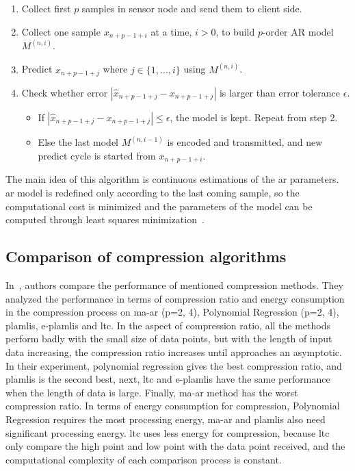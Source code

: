 \begin{enumerate}
    \item Collect first $p$ samples in sensor node and send them to client side.
    \item Collect one sample $x_{n+p-1+i}$ at a time, $i > 0$, to build
    $p$-order
    AR model $M^{(n, i)}$.
    \item Predict $x_{n+p-1+j}$ where $j \in \{1, ..., i\}$ using $M^{(n, i)}$.
    \item Check whether error $ |\hat{x}_{n+p-1+j} - x_{n+p-1+j}|$ is larger
    than error tolerance $\epsilon$.
        \begin{itemize}
            \item If $|\hat{x}_{n+p-1+j} - x_{n+p-1+j}| \leqslant \epsilon$, the
            model is kept. Repeat from step 2.
            \item Else the last model $M^{(n, i-1)}$ is encoded and transmitted,
            and new predict cycle is started from $x_{n+p-1+i}$.
        \end{itemize}
\end{enumerate}
The main idea of this algorithm is continuous estimations of the \acrshort{ar}
parameters. \acrshort{ar} model is redefined only according to the last coming
sample, so the computational cost is minimized and the parameters of the model
can be computed through least squares minimization~\cite{zordan2012compress}.


\subsection{Comparison of compression algorithms}
\label{sec:comparision-lossy}
In~\cite{zordan2014performance}, authors compare the performance of mentioned
compression methods. They analyzed the performance in terms of compression ratio
and energy consumption in the compression process on \acrshort{ma-ar} (p={2,
4}), Polynomial Regression (p={2, 4}), \acrshort{plamlis}, \acrshort{e-plamlis}
and \acrshort{ltc}. In the aspect of compression ratio, all the methods perform
badly with the small size of data points, but with the length of input data
increasing, the compression ratio increases until approaches an asymptotic. In
their experiment, polynomial regression gives the best compression ratio, and
\acrshort{plamlis} is the second best, next, \acrshort{ltc} and
\acrshort{e-plamlis} have the same performance when the length of data is large.
Finally, \acrshort{ma-ar} method has the worst compression ratio. In terms of
energy consumption for compression, Polynomial Regression requires the most
processing energy, \acrshort{ma-ar} and \acrshort{plamlis} also need significant
processing energy. \acrshort{ltc} uses less energy for compression, because
\acrshort{ltc} only compare the high point and low point with the data point
received, and the computational complexity of each comparison process is
constant.
